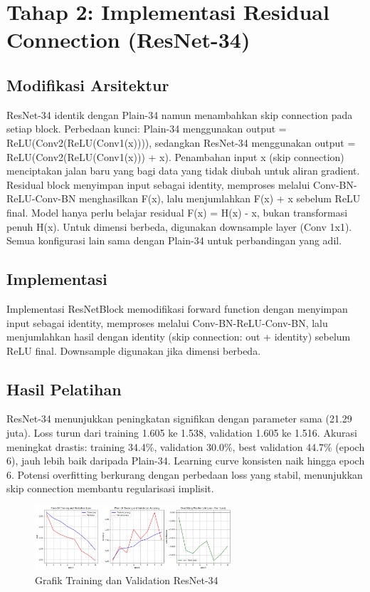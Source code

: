 \documentclass[11pt,a4paper]{article}
\begin{document}
\section{Tahap 2: Implementasi Residual Connection (ResNet-34)}
\subsection{Modifikasi Arsitektur}
ResNet-34 identik dengan Plain-34 namun menambahkan skip connection pada setiap block. Perbedaan kunci: Plain-34 
menggunakan output = ReLU(Conv2(ReLU(Conv1(x)))), sedangkan ResNet-34 menggunakan output = ReLU(Conv2(ReLU(Conv1(x))) + x). 
Penambahan input x (skip connection) menciptakan jalan baru yang bagi data yang tidak diubah untuk aliran gradient. Residual block menyimpan input sebagai identity, 
memproses melalui Conv-BN-ReLU-Conv-BN menghasilkan F(x), lalu menjumlahkan F(x) + x sebelum ReLU final. Model hanya perlu belajar residual F(x) = H(x) - x, 
bukan transformasi penuh H(x). Untuk dimensi berbeda, digunakan downsample layer (Conv 1x1). Semua konfigurasi lain sama dengan Plain-34 untuk perbandingan yang adil.

\subsection{Implementasi}
Implementasi ResNetBlock memodifikasi forward function dengan menyimpan input sebagai identity, memproses melalui Conv-BN-ReLU-Conv-BN, lalu menjumlahkan hasil dengan identity (skip connection: out + identity) sebelum ReLU final. Downsample digunakan jika dimensi berbeda.

\subsection{Hasil Pelatihan}
ResNet-34 menunjukkan peningkatan signifikan dengan parameter sama (21.29 juta). Loss turun dari training 1.605 ke 1.538, validation 1.605 ke 1.516. Akurasi meningkat drastis: training 34.4\%, validation 30.0\%, best validation 44.7\% (epoch 6), jauh lebih baik daripada Plain-34. Learning curve konsisten naik hingga epoch 6. Potensi overfitting berkurang dengan perbedaan loss yang stabil, menunjukkan skip connection membantu regularisasi implisit.
\begin{figure}[h]
\centering
\includegraphics[width=0.65\textwidth]{Figure/resnet34.png}
\caption{Grafik Training dan Validation ResNet-34}
\label{fig:resnet34}
\end{figure}
\end{document}
